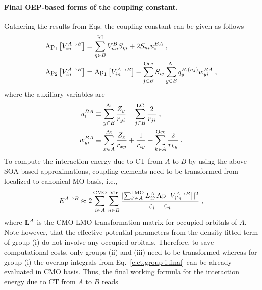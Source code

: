 \paragraph{Final OEP-based forms of the coupling constant.}
Gathering the results from Eqs. the coupling constant
can be given as follows
%
\begin{subequations}
\begin{align} \label{e:ct-murell-etal.vin.oep}
\Approx{ V_{in}^{A\rightarrow B} }{1}
       &= \sum_{\eta\in B}^{\rm RI} V^B_{n\eta} S_{\eta i} 
 +
2 S_{ni} u_i^{BA} \;, \\
%
\Approx{ V_{in}^{A\rightarrow B} }{2} &=
\Approx{ V_{in}^{A\rightarrow B} }{1} -
  \sum_{j   \in B}^{\rm Occ} S_{ij}
  \sum_{y   \in B}^{\rm At} q_y^{B,(nj)} w_{yi}^{BA}
\;,
\end{align}
\end{subequations}
%
where the auxiliary variables are
%
\begin{subequations}
\begin{align} \label{e:ct-murell-etal.vin.oep.aux-var}
 u_i^{BA} &\equiv    
 \sum_{y\in B}^{\rm At}
  \frac{Z_y}{ r_{yi} } 
 -
 \sum_{j\in B}^{\rm LC}
  \frac{2}{r_{ji}} 
                \;, \\
 w_{yi}^{BA} &\equiv 
   \sum_{x\in A}^{\rm At}
   \frac{Z_x}{r_{xy}}
  + \frac{1}{r_{iy}}
  - \sum_{k\in A}^{\rm Occ}
    \frac{2}{r_{ky}} 
                \;.
\end{align}
\end{subequations}
%
To compute the interaction energy due to CT from $A$ to $B$ by using the above SOA\hyp{}based
approximations, coupling elements need to be transformed from localized to canonical MO basis, i.e.,
%
\begin{equation} \label{e:ect-oep.prefinal}
 E^{A\rightarrow B} \approx
 2 
 \sum_{i\in A}^{\rm CMO}
 \sum_{n\in B}^{\rm Vir}
 \frac{
 \lvert
   \sum_{i'\in A}^{\rm LMO} L_{ii'}^A
   \text{Ap}_{} \left[ {V_{i'n}^{A\rightarrow B}} \right]  
 \rvert^2 }{\varepsilon_i - \varepsilon_n} \;,
\end{equation}
%
where ${\bf L}^A$ is the CMO\hyp{}LMO transformation matrix for occupied orbitals of $A$. 
Note however, that the effective potential parameters from the density fitted term of group (i) 
do not involve any occupied orbitals.
Therefore, to save computational costs, only groups (ii) and (iii) need to be transformed
whereas for group (i) the overlap integrals from Eq.~\eqref{e:ct.group-i.final} 
can be already evaluated in CMO basis.
Thus, the final working formula for the interaction energy due to CT from $A$ to $B$ reads
